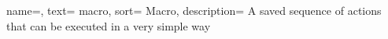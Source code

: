 {
  name=,
  text= macro,
  sort= Macro,
  description= {A saved sequence of actions that can be executed in a very simple way}
}




